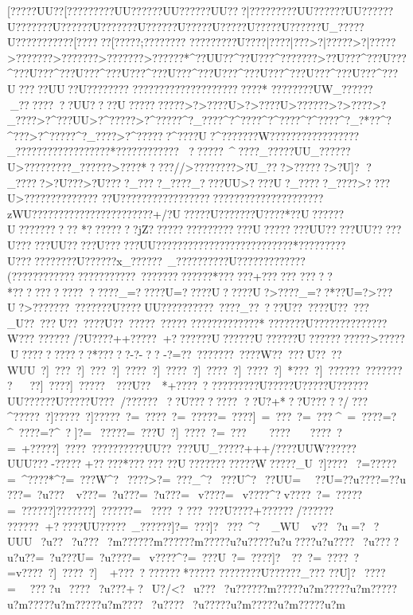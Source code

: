 {{{{{{{{{{{{{{{{{{{{{{{{{{{{{ [?????UU??[?????????UU??????UU??????UU???|?????????UU??????UU??????U???????U??????U???????U??????U?? ???U?? ???U?????U??????U_????{?U?????{???? ??[??????[???  ??;???  ?{????
?{???? ????U????|???  ?|???  >?|?????>?|?????>???????>???????>???????>??????*^??UU??^??U???^???????>??U???^???U???^???U???^???U???^???U???^???U???^???U???^???U???^???U???^???U???^???U???? ?UU??U?? ??????
 ??????? ?????????????????*
 ???  ?????UW_??????_????????UU? ??  ?U???  ?????  ??>?>????U>?>????U>??? ???>?>? ???>?_? ???>?^???UU>?^?????>?^?????^?_? ???^?^? ???^?^? ???^?^? ???^?_? *??^?^?  ??>?^?????^?_? ???>?^??????^????U?^???????W??????????????? ??_??????????????????*????????????
??????~^??  ??_?????UU_??????U>?????????_???? ??>????*????//>??? ?????>?U_???>??????>?U]?
?_???? ?>?U? ??>?U????_???  ?_???? _????UU>?? ??U?_???? ?_???? >?? ??U>??  ????  ????  ????
??U????????????????? ????  ?????????????????zWU???? ????????????? ??????+/?U?????U???????U????*??U??????U??????????
*?????? ??jZ?????? ????????????U????? ???UU?????UU?????U??????UU?????U??????UU??????????????????????????*?????????U??? ????????U??????x_??????~_??????????U?????????????(?????? ???????????? ?????~ ?????????????*??????+??????
????? *????  ????????????_=?????U=?????U?????U?>????_=??*??U=?>? ??U?>???????~?   ?????  ?U????UU??????????~????_??~???U??~????U??~???_U??~???U??~????U??~?????~?????
 ?????????????*
???????U??????????????W???
??????/?U????++?????+???????U??????U??????U??? ??????  ??>?????U??  ???? ?????*????? -?-??
-?=??~???????~????W??~???U??~??WUU~?]~ ???~?]~ ???~?]~????~?]~????~?]~????~?]~????~?]~*???~?]~??????~???????~?~~??]~????]~ ?????~~???U??~~*+????~?
??????? ??U??? ??U??? ??U??????UU??????U??? ??U??? /????????U????????
??U?+*??U?????/??}?^?????~?]?????~?]?????~?=~????~?=~????}?=~????]~=~ ???~?=~???^~=~????=?^~????=?^~?
]?=~?????=~???U~?]~????~?=~???~~~????~~~????~?=~+?????]~????~???????}???UU??~???UU_?????+++/????UUW??????UUU???-?????
+?????*??????
??U?????????? ??W?????_U~?]????~?=?????=~^????*^?=~???W^?~????>?=~???_^?~???U^?~??UU=~~ ??U=??u????=??u
???=~?u ???~v ???=~?u ???=~?u ???=~v????=~v????^?v????~?=~?????=~??????]???????]~??????=~ 
????~? 
???~? ??U????+??????/??????
??????+?????}UU?????~_??? ???]?=~ ???]?~???~^?~_WU~v  ??~?u   =?~?UUU~?u  ??~?u ???~?m?????}?m?????}?m?????u?u?????u?u????u?u????~?u????u?u  ??=~?u???U=~?u????=~v????^?=~???U~?=~????]?~~??~?=~????~?=v????~?]~????~?]~
+???~?
??????*?????
?????? ??U??????_???
??U]?~????=~~????u~????~?u???+?~U?/<?~u???~?u?????}?m?????u?m?????u?m?????u?m?????u?m?????u?m????~?u????~?u?????u?m?????u?m?????u?m 
}}}}}}}}}}}}}}}}}}}}}}}}}}
